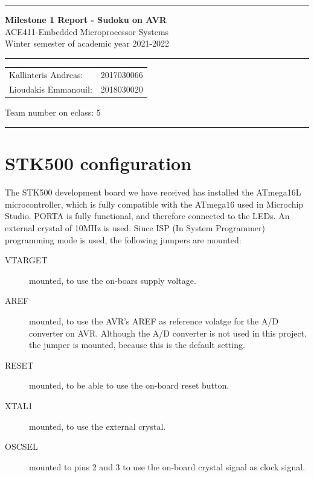 \documentclass[12pt, a4]{article}
\begin{document}
\noindent \rule{\textwidth}{3pt}
\begin{center}
	{\bf \Large{Milestone 1 Report - Sudoku on AVR}}\\
	ACE411-Embedded Microprocessor Systems \\
	Winter semester of academic year 2021-2022
	\rule{\textwidth}{0.2mm} 
	\begin{tabular}{l r}
		Kallinteris Andreas:& 2017030066 \\ 
		Lioudakis Emmanouil:      &2018030020 
	\end{tabular} \vrule \hspace{3mm}
	\indent	Team number on eclass:  5
	\rule{\textwidth}{1pt}
\end{center}

\section*{STK500 configuration}
The STK500 development board we have received has installed the ATmega16L microcontroller, which is fully compatible with the ATmega16 used in Microchip Studio. PORTA is fully functional, and therefore connected to the LEDs. An external crystal of 10MHz is used. Since ISP (In System Programmer) programming mode is used, the following jumpers are mounted:
\begin{description}
\item[VTARGET] mounted, to use the on-boars supply voltage.
\item[AREF] mounted, to use the AVR's AREF as reference volatge for the A/D converter on AVR. Although the A/D converter is not used in this project, the jumper is mounted, because this is the default setting.
\item[RESET] mounted, to be able to use the on-board reset button.
\item[XTAL1] mounted, to use the external crystal.
\item[OSCSEL] mounted to pins 2 and 3 to use the on-board crystal signal as clock signal.
\end{description}
\end{document}
